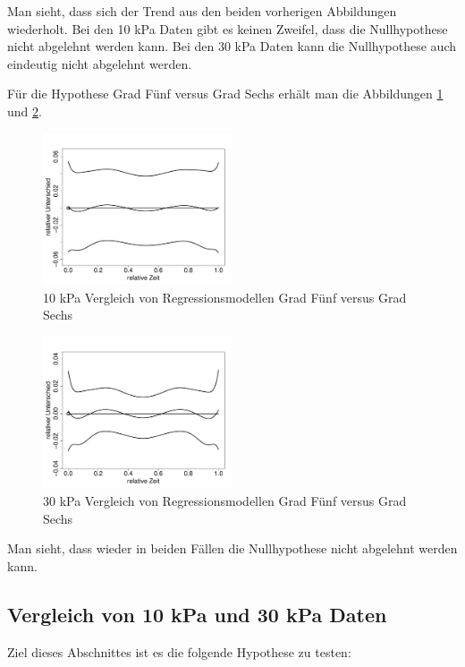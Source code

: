 \documentclass[12pt,a4paper]{article}
\theoremstyle{definition}
\theoremstyle{definition}
\theoremstyle{definition}
\theoremstyle{definition}
\begin{document}
Man sieht, dass sich der Trend aus den beiden vorherigen Abbildungen wiederholt. Bei den 10 kPa Daten gibt es keinen Zweifel, dass die Nullhypothese nicht abgelehnt werden kann. Bei den 30 kPa Daten kann die Nullhypothese auch eindeutig nicht abgelehnt werden.

Für die Hypothese Grad Fünf versus Grad Sechs erhält man die Abbildungen \ref{10kPa-Regmod-5-6} und \ref{30kPa-Regmod-5-6}.

\begin{figure}[H] 
  \centering
     \includegraphics[width=0.5\textwidth]{30kPa-poly-KB-5-6.pdf}
  \caption{10 kPa Vergleich von Regressionsmodellen Grad Fünf versus Grad Sechs}
  \label{10kPa-Regmod-5-6}
\end{figure}

\begin{figure}[H] 
  \centering
     \includegraphics[width=0.5\textwidth]{10kPa-poly-KB-5-6.pdf}
  \caption{30 kPa Vergleich von Regressionsmodellen Grad Fünf versus Grad Sechs}
  \label{30kPa-Regmod-5-6}
\end{figure}

Man sieht, dass wieder in beiden Fällen die Nullhypothese nicht abgelehnt werden kann.


\subsection{Vergleich von 10 kPa und 30 kPa Daten}
Ziel dieses Abschnittes ist es die folgende Hypothese zu testen:
\end{document}
